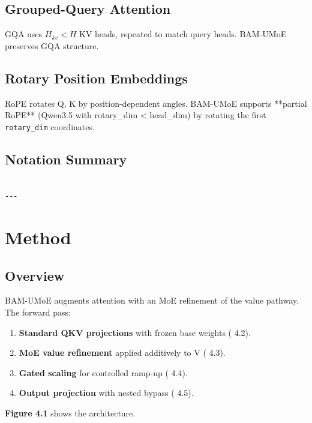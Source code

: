\subsection{Grouped-Query Attention}

GQA uses $H_{kv} < H$ KV heads, repeated to match query heads. BAM-UMoE 
preserves GQA structure.

\subsection{Rotary Position Embeddings}

RoPE rotates Q, K by position-dependent angles. BAM-UMoE supports **partial 
RoPE** (Qwen3.5 with rotary\_dim \textless{} head\_dim) by rotating the first 
\texttt{rotary\_dim} coordinates.

\subsection{Notation Summary}

\begin{lstlisting}

---
\end{lstlisting}

\section{Method}

\subsection{Overview}

BAM-UMoE augments attention with an MoE refinement of the value pathway. 
The forward pass:

\begin{enumerate}
\item \textbf{Standard QKV projections} with frozen base weights ( 4.2).
\item \textbf{MoE value refinement} applied additively to V ( 4.3).
\item \textbf{Gated scaling} for controlled ramp-up ( 4.4).
\item \textbf{Output projection} with nested bypass ( 4.5).

\end{enumerate}
\textbf{Figure 4.1} shows the architecture.

